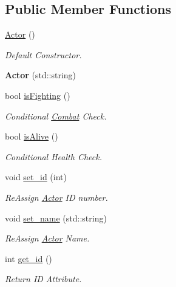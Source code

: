 \subsection*{Public Member Functions}
\begin{DoxyCompactItemize}
\item 
\mbox{\label{classActor_a2a0ff4335a1ee9096df90f288c026c8b}} 
\mbox{\hyperlink{classActor_a2a0ff4335a1ee9096df90f288c026c8b}{Actor}} ()
\begin{DoxyCompactList}\small\item\em Default Constructor. \end{DoxyCompactList}\item 
\mbox{\label{classActor_af8f3f7be89b9933e46ec096a1a2ceb6a}} 
{\bfseries Actor} (std\+::string)
\item 
bool \mbox{\hyperlink{classActor_a8836e8c2b76103a8dc47ff408d89ce3e}{is\+Fighting}} ()
\begin{DoxyCompactList}\small\item\em Conditional \mbox{\hyperlink{classCombat}{Combat}} Check. \end{DoxyCompactList}\item 
bool \mbox{\hyperlink{classActor_aee8e4efcd61cfc994a232730d89a4fef}{is\+Alive}} ()
\begin{DoxyCompactList}\small\item\em Conditional Health Check. \end{DoxyCompactList}\item 
void \mbox{\hyperlink{classActor_a252bc0e75933e7e3062d54b8e1f8fafb}{set\+\_\+id}} (int)
\begin{DoxyCompactList}\small\item\em Re\+Assign \mbox{\hyperlink{classActor}{Actor}} ID number. \end{DoxyCompactList}\item 
void \mbox{\hyperlink{classActor_a7bf5eaa29d6275591d35fd43f67dd7be}{set\+\_\+name}} (std\+::string)
\begin{DoxyCompactList}\small\item\em Re\+Assign \mbox{\hyperlink{classActor}{Actor}} Name. \end{DoxyCompactList}\item 
int \mbox{\hyperlink{classActor_aa6a652e6ced2aad8f848ea7324365d69}{get\+\_\+id}} ()
\begin{DoxyCompactList}\small\item\em Return ID Attribute. \end{DoxyCompactList}\item 

\end{DoxyCompactItemize}
